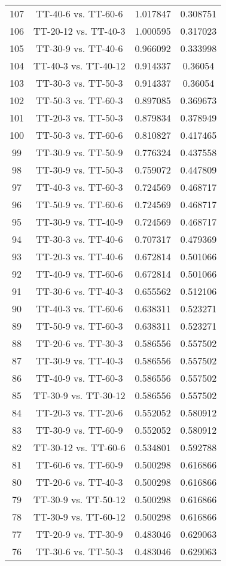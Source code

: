 \documentclass[a4paper,10pt]{article}
\begin{document}
\begin{landscape}
\begin{table}[!htp]
\begin{tabular}{cccc}
107&TT-40-6 vs. TT-60-6&1.017847&0.308751\\
106&TT-20-12 vs. TT-40-3&1.000595&0.317023\\
105&TT-30-9 vs. TT-40-6&0.966092&0.333998\\
104&TT-40-3 vs. TT-40-12&0.914337&0.36054\\
103&TT-30-3 vs. TT-50-3&0.914337&0.36054\\
102&TT-50-3 vs. TT-60-3&0.897085&0.369673\\
101&TT-20-3 vs. TT-50-3&0.879834&0.378949\\
100&TT-50-3 vs. TT-60-6&0.810827&0.417465\\
99&TT-30-9 vs. TT-50-9&0.776324&0.437558\\
98&TT-30-9 vs. TT-50-3&0.759072&0.447809\\
97&TT-40-3 vs. TT-60-3&0.724569&0.468717\\
96&TT-50-9 vs. TT-60-6&0.724569&0.468717\\
95&TT-30-9 vs. TT-40-9&0.724569&0.468717\\
94&TT-30-3 vs. TT-40-6&0.707317&0.479369\\
93&TT-20-3 vs. TT-40-6&0.672814&0.501066\\
92&TT-40-9 vs. TT-60-6&0.672814&0.501066\\
91&TT-30-6 vs. TT-40-3&0.655562&0.512106\\
90&TT-40-3 vs. TT-60-6&0.638311&0.523271\\
89&TT-50-9 vs. TT-60-3&0.638311&0.523271\\
88&TT-20-6 vs. TT-30-3&0.586556&0.557502\\
87&TT-30-9 vs. TT-40-3&0.586556&0.557502\\
86&TT-40-9 vs. TT-60-3&0.586556&0.557502\\
85&TT-30-9 vs. TT-30-12&0.586556&0.557502\\
84&TT-20-3 vs. TT-20-6&0.552052&0.580912\\
83&TT-30-9 vs. TT-60-9&0.552052&0.580912\\
82&TT-30-12 vs. TT-60-6&0.534801&0.592788\\
81&TT-60-6 vs. TT-60-9&0.500298&0.616866\\
80&TT-20-6 vs. TT-40-3&0.500298&0.616866\\
79&TT-30-9 vs. TT-50-12&0.500298&0.616866\\
78&TT-30-9 vs. TT-60-12&0.500298&0.616866\\
77&TT-20-9 vs. TT-30-9&0.483046&0.629063\\
76&TT-30-6 vs. TT-50-3&0.483046&0.629063\\

\end{tabular}
\end{table}
\end{landscape}
\end{document}
